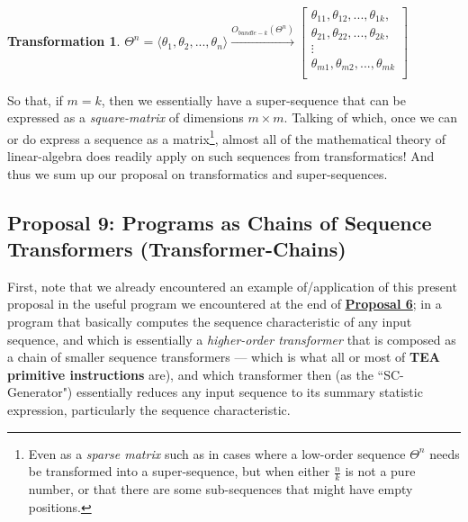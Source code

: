 \documentclass[a4paper, 18pt]{book} %
\newtheorem{trans}{Transformation}
\begin{document}
\vspace{2em}
\begin{trans}
$\Theta^n = \langle \theta_1, \theta_2, ..., \theta_n \rangle \xrightarrow{O_{bundle-k}(\Theta^n)}
 \begin{bmatrix}
 \theta_{11}, \theta_{12} ,..., \theta_{1k},\\
   \theta_{21}, \theta_{22} ,... , \theta_{2k},\\
   \vdots \\
     \theta_{m1}, \theta_{m2} ,..., \theta_{mk}\\
 \end{bmatrix}$
\end{trans}
\vspace{2em}

So that, if $m=k$, then we essentially have a super-sequence that can be expressed as a \textit{square-matrix} of dimensions $m \times m$. Talking of which, once we can or do express a sequence as a matrix\footnote{Even as a \textit{sparse matrix} such as in cases where a low-order sequence $\Theta^n$ needs be transformed into a super-sequence, but when either $\frac{n}{k}$ is not a pure number, or that there are some sub-sequences that might have empty positions.}, almost all of the mathematical theory of linear-algebra does readily apply on such sequences from transformatics! And thus we sum up our proposal on transformatics and super-sequences.

\subsection{Proposal 9: Programs as Chains of Sequence Transformers (Transformer-Chains)\cite{lutalo_2025_trans_genetics}\cite{cli_tttt}}
\label{PROP9}

First, note that we already encountered an example of/application of this present proposal in the useful program we encountered at the end of \textbf{\hyperref[PROP6]{Proposal 6}}; in a program that basically computes the sequence characteristic of any input sequence, and which is essentially a \textit{higher-order transformer} that is composed as a chain of smaller sequence transformers  --- which is what all or most of \textbf{TEA primitive instructions}\cite{Lutalo2024TEATAZ} are), and which transformer then (as the ``SC-Generator") essentially reduces any input sequence to its summary statistic expression, particularly the sequence characteristic.\\
\end{document}
